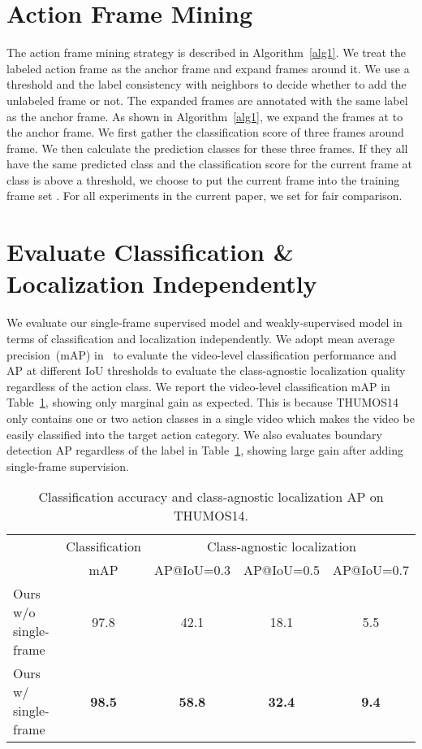 \documentclass[runningheads]{llncs}
\begin{document}
	
	\section{Action Frame Mining}    	
	The action frame mining strategy is described in Algorithm~\ref{alg1}.
	We treat the labeled action frame as the anchor frame and expand frames around it.
	We use a threshold  and the label consistency with neighbors to decide whether to add the unlabeled frame or not.
	The expanded frames are annotated with the same label as the anchor frame.  
	As shown in Algorithm~\ref{alg1}, we expand the frames at  to the anchor frame.
	We first gather the classification score of three frames around  frame. We then calculate the prediction classes for these three frames. If they all have the same predicted class and the classification score for the current frame at class  is above a threshold, we choose to put the current frame into the training frame set . For all experiments in the current paper, we set  for fair comparison.
	
	\section{Evaluate Classification \& Localization Independently}
	We evaluate our single-frame supervised model and weakly-supervised model in terms of classification and localization independently.
	We adopt mean average precision~(mAP) in~\cite{TSN2016ECCV} to evaluate the video-level classification performance and AP at different IoU thresholds to evaluate the class-agnostic localization quality regardless of the action class.
	We report the video-level classification mAP in Table~\ref{tab:act}, showing only marginal gain as expected. 
	This is because THUMOS14 only contains one or two action classes in a single video which makes the video be easily classified into the target action category.
	We also evaluates boundary detection AP regardless of the label in Table~\ref{tab:act}, showing large gain after adding single-frame supervision.
	
	\begin{table}[!t]
		\centering
		
		\caption{Classification accuracy and class-agnostic localization AP on THUMOS14.}
		\begin{tabular}{l|c|ccc}
			\hline
			& Classification & \multicolumn{3}{c}{Class-agnostic localization} \\ \cline{2-5}
			&  mAP   & AP@IoU=0.3 & AP@IoU=0.5 & AP@IoU=0.7\\ \hline
			Ours w/o single-frame & 97.8 &  42.1  & 18.1 & 5.5\\
			Ours w/ single-frame &   \textbf{98.5} & \textbf{58.8} & \textbf{32.4} & \textbf{9.4}\\
			\hline
		\end{tabular}
		\label{tab:act}
	\end{table}
	
\end{document}
